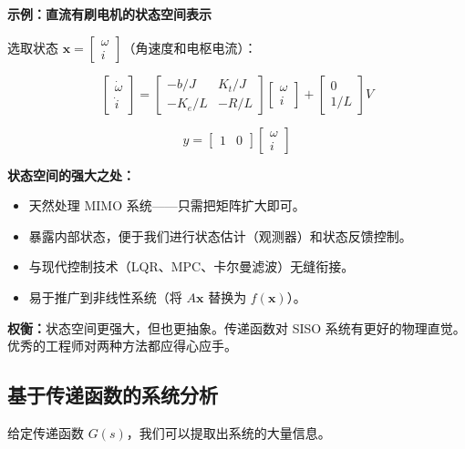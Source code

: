 \textbf{示例：直流有刷电机的状态空间表示}

选取状态 $\mathbf{x} = \begin{bmatrix} \omega \\ i \end{bmatrix}$（角速度和电枢电流）：

\begin{equation}
\begin{bmatrix} \dot{\omega} \\ \dot{i} \end{bmatrix} =
\begin{bmatrix} -b/J & K_t/J \\ -K_e/L & -R/L \end{bmatrix}
\begin{bmatrix} \omega \\ i \end{bmatrix} +
\begin{bmatrix} 0 \\ 1/L \end{bmatrix} V
\end{equation}

\begin{equation}
y = \begin{bmatrix} 1 & 0 \end{bmatrix} \begin{bmatrix} \omega \\ i \end{bmatrix}
\end{equation}

\textbf{状态空间的强大之处：}
\begin{itemize}
    \item 天然处理 MIMO 系统——只需把矩阵扩大即可。
    \item 暴露内部状态，便于我们进行状态估计（观测器）和状态反馈控制。
    \item 与现代控制技术（LQR、MPC、卡尔曼滤波）无缝衔接。
    \item 易于推广到非线性系统（将 $A\mathbf{x}$ 替换为 $f(\mathbf{x})$）。
\end{itemize}

\textbf{权衡：}状态空间更强大，但也更抽象。传递函数对 SISO 系统有更好的物理直觉。优秀的工程师对两种方法都应得心应手。

\subsection{基于传递函数的系统分析}

给定传递函数 $G(s)$，我们可以提取出系统的大量信息。

